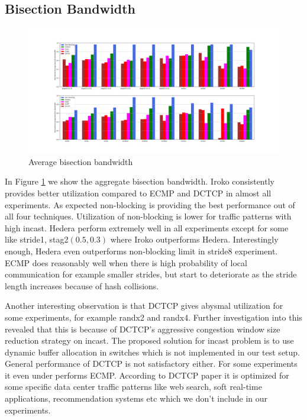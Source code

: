 \subsection{Bisection Bandwidth}

\begin{figure}
	\centering
	\includegraphics[width=1\linewidth]{rate.png}
	\caption{Average bisection bandwidth}
	\label{fig:rate}
\end{figure}

In Figure \ref{fig:rate} we show the aggregate bisection bandwidth. Iroko
consistently provides better utilization compared to ECMP and DCTCP in almost
all experiments. As expected non-blocking is providing the best performance out
of all four techniques. Utilization of non-blocking is lower for traffic
patterns with high incast. Hedera perform extremely well in all experiments
except for some like stride1, stag2$(0.5,0.3)$ where Iroko outperforms Hedera.
Interestingly enough, Hedera even outperforms non-blocking limit in stride8
experiment. ECMP does reasonably well when there is high probability of local
communication for example smaller strides, but start to deteriorate as the
stride length increases because of hash collisions.

Another interesting observation is that DCTCP gives abysmal utilization for some
experiments, for example randx2 and randx4. Further investigation into this
revealed that this is because of DCTCP's aggressive congestion window size
reduction strategy on incast. The proposed solution for incast problem is to use
dynamic buffer allocation in switches which is not implemented in our test
setup. General performance of DCTCP is not satisfactory either. For some
experiments it even under performs ECMP.  According to DCTCP paper it is
optimized for some specific data center traffic patterns like web search, soft
real-time applications, recommendation systems etc which we don't include in our
experiments.

